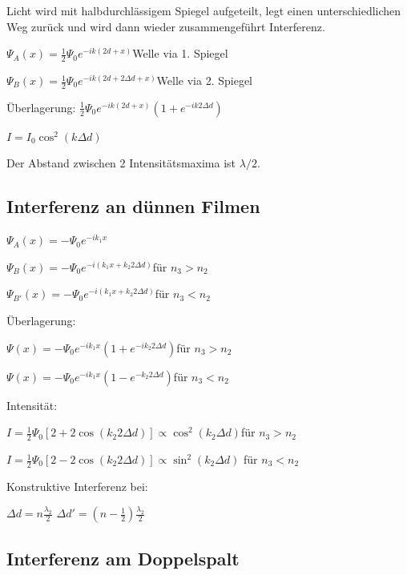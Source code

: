 \documentclass[10pt,a4paper]{scrartcl}
\begin{document}
\begin{multicols*}{3}
	Licht wird mit halbdurchlässigem Spiegel aufgeteilt, legt einen unterschiedlichen Weg zurück und wird dann wieder zusammengeführt \dahe Interferenz.
	
	$\Psi_A(x)=\frac{1}{2}\Psi_0e^{-ik(2d+x)}$\hfill Welle via 1. Spiegel
	
	$\Psi_B(x)=\frac{1}{2}\Psi_0e^{-ik(2d+2\Delta d+x)}$\hfill Welle via 2. Spiegel
	
	Überlagerung: \hfill$\frac{1}{2}\Psi_0e^{-ik(2d+x)}(1+e^{-ik2\Delta d})$
	
	$I=I_0\cos^2(k\Delta d)$
	
	Der Abstand zwischen 2 Intensitätsmaxima ist $\lambda/2$.
	
	\subsection{Interferenz an dünnen Filmen}
	
	
	
	$\Psi_A(x)=-\Psi_0e^{-ik_1x}$
	
	$\Psi_B(x)=-\Psi_0e^{-i(k_1x+k_2 2\Delta d)}$\hfill für $n_3>n_2$
	
	$\Psi_{B'}(x)=-\Psi_0e^{-i(k_1x+k_2 2\Delta d)}$\hfill für $n_3<n_2$
	
	Überlagerung:
	
	$\Psi(x)=-\Psi_0e^{-ik_1x}(1+e^{-ik_2 2\Delta d})$\hfill für $n_3>n_2$
	
	$\Psi(x)=-\Psi_0e^{-ik_1x}(1-e^{-k_2 2\Delta d})$\hfill für $n_3<n_2$
	
	Intensität:
	
	$I=\frac{1}{2}\Psi_0[2+2\cos(k_2 2 \Delta d)]\propto \cos^2(k_2 \Delta d)$\hfill für $n_3>n_2$
	
	$I=\frac{1}{2}\Psi_0[2-2\cos(k_2 2 \Delta d)]\propto \sin^2(k_2 \Delta d)$ \hfill für $n_3<n_2$
	
	Konstruktive Interferenz bei:
	
	$\Delta d = n\frac{\lambda_2}{2}$ \hfill $\Delta d'=(n-\frac{1}{2})\frac{\lambda_2}{2}$
	
	\subsection{Interferenz am Doppelspalt}
	

\end{multicols*}
\end{document}
